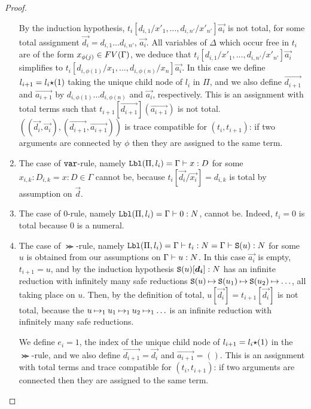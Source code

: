 \begin{proof}
\begin{enumerate}
  By the induction hypothesis, 
  $t_i[d_{i,1}/x'_1,\ldots,d_{i,{n'}}/x'_{n'}]\vec{a_i}$ is not total,
  for some total assignment $\vec{d_i} = d_{i,1}\ldots d_{i,{n'}}$, $\vec{a_i}$.
  All variables of $\Delta$ which occur free in $t_i$ are of the form 
  $x_{\phi(j)} \in {{\relax FV}}(\Gamma)$, we deduce that
  $
   t_i[d_{i,1}/x'_1,\ldots,d_{i,{n'}}/x'_{n'}]\vec{a_i}
  $
  simplifies to
  $
   t_i[d_{i,\phi(1)}/x_1,\ldots,d_{i,\phi(n)}/x_n]\vec{a_i} 
  $.
  In this case 
  we define $l_{i+1} = l_i{\star}(1)$ taking the unique child node of $l_i$ in $\Pi$, and we
  also define $\vec{d_{i+1}}$ and $\vec{a_{i+1}}$ by $d_{i,\phi(1)}\ldots d_{i,\phi(n)}$
  and $\vec{a_i}$, respectively. This is an assignment with total terms such that
  $t_{i+1}[\vec{d_{i+1}}](\vec{a_{i+1}})$ is not total.
  $((\vec{d_i},\vec{a_i}),(\vec{d_{i+1}},\vec{a_{i+1}}))$
  is trace compatible for $(t_i,t_{i+1})$: if two arguments are connected 
  by $\phi$ then they are assigned to the same term. 

\item
  The case of ${\tt var}$-rule, namely ${\tt Lbl}(\Pi,l_i) = \Gamma\vdash x:D$ 
  for some $x_{i,k}:D_{i,k} = x:D \in \Gamma$
  cannot be, because $t_i [\vec{d_i}/\vec{x_i}] = d_{i,k}$ is total  by assumption on $\vec{d}$.
  
\item
  The case of $0$-rule, namely ${\tt Lbl}(\Pi,l_i) = \Gamma\vdash 0:{N}$, 
  cannot be. Indeed, $t_i = 0$ is total because $0$ is a numeral.



\item 
  The case of $\Succ$-rule, 
  namely ${\tt Lbl}(\Pi,l_i) = \Gamma\vdash t_i: {N} = \Gamma\vdash {\tt S}(u): {N}$
  for some $u$ is obtained from our assumptions on
  $\Gamma\vdash u: {N}$. In this case $\vec{a_i}$ is empty, $t_{i+1}=u$, and
  by the induction hypothesis $\Succ(u)[\vec{d_i}]:\N$ has an infinite reduction with
  infinitely many safe reductions
  ${\tt S}(u) \mathbin{\mapsto}  {\tt S}(u_1) \mathbin{\mapsto} {\tt S}(u_2) \mathbin{\mapsto} \ldots$,
  all taking place on $u$.
  Then, by the definition of total, $u[\vec{d_i}] =t_{i+1}[\vec{d_i}] $ is not total, because the
 $u \mathbin{\mapsto}_1  u_1 \mathbin{\mapsto}_1 u_2 \mathbin{\mapsto}_1 \ldots$ is an infinite reduction with
  infinitely many safe reductions.

  We define $e_{i}=1$, 
  the index of the unique child node of $l_{i+1}=l_i{\star}(1)$ in the $\Succ$-rule, and
  we also define $\vec{d_{i+1}} = \vec{d_i}$ and $\vec{a_{i+1}} = ()$. 
  This is an assignment with total terms and 
  trace compatible for $(t_i,t_{i+1})$: if two arguments are connected then they are assigned
  to the same term. 


\end{enumerate}
\end{proof}
